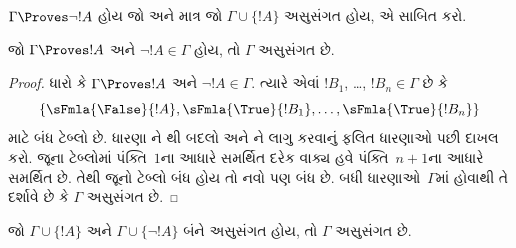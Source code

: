 \begin{prob}
$\Gamma \Proves \lnot !A$ હોય જો અને માત્ર જો
$\Gamma \cup \{!A\}$ અસુસંગત હોય, એ સાબિત કરો.
\end{prob}

\begin{prop}
  જો $\Gamma \Proves !A$ અને $\lnot !A \in \Gamma$ હોય, તો $\Gamma$
  અસુસંગત છે.
\end{prop}

\begin{proof}
  ધારો કે $\Gamma \Proves !A$ અને $\lnot !A \in \Gamma$. ત્યારે એવાં
  $!B_1$, \dots, $!B_n \in \Gamma$ છે કે
  \[
  \{\sFmla{\False}{!A}, \sFmla{\True}{!B_1}, \dots, \sFmla{\True}{!B_n}\}
  \]
  માટે બંધ ટેબ્લો છે. ધારણા ને
  થી બદલો અને ને
  \TRule{\True}{\lnot} લાગુ કરવાનું ફલિત ધારણાઓ પછી દાખલ કરો. જૂના
  ટેબ્લોમાં પંક્તિ~$1$ના આધારે સમર્થિત દરેક વાક્ય હવે
  પંક્તિ~$n+1$ના આધારે સમર્થિત છે. તેથી જૂનો ટેબ્લો બંધ હોય તો
  નવો પણ બંધ છે. બધી ધારણાઓ~$\Gamma$માં હોવાથી તે દર્શાવે છે કે
  $\Gamma$ અસુસંગત છે.
\end{proof}

\begin{prop}
  જો $\Gamma \cup \{!A\}$ અને $\Gamma \cup \{\lnot !A\}$ બંને
  અસુસંગત હોય, તો $\Gamma$ અસુસંગત છે.
\end{prop}

